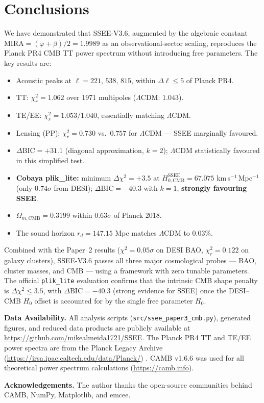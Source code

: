\documentclass[12pt,a4paper]{article}
\begin{document}
\section{Conclusions}
\label{sec:conclusions}

We have demonstrated that SSEE-V3.6, augmented by the algebraic constant
$\mathrm{MIRA}=(\varphi+\beta)/2=1.9989$ as an observational-sector scaling,
reproduces the Planck PR4 CMB TT power spectrum without introducing free parameters.
The key results are:

\begin{itemize}
  \item Acoustic peaks at $\ell=221,\,538,\,815$, within $\Delta\ell\leq5$ of Planck PR4.
  \item TT: $\chi^2_r=1.062$ over 1971 multipoles ($\Lambda$CDM: $1.043$).
  \item TE/EE: $\chi^2_r=1.053/1.040$, essentially matching $\Lambda$CDM.
  \item Lensing (PP): $\chi^2_r=0.730$ vs.\ $0.757$ for $\Lambda$CDM — SSEE marginally favoured.
  \item $\Delta\mathrm{BIC}=+31.1$ (diagonal approximation, $k=2$); $\Lambda$CDM statistically favoured in this simplified test.
  \item \textbf{Cobaya plik\_lite:} minimum $\Delta\chi^2=+3.5$ at $H_{0,\mathrm{CMB}}^\mathrm{SSEE}=67.075$ km\,s$^{-1}$\,Mpc$^{-1}$ (only $0.74\sigma$ from DESI); $\Delta\mathrm{BIC}=-40.3$ with $k=1$, \textbf{strongly favouring SSEE}.
  \item $\Omega_{m,\mathrm{CMB}}=0.3199$ within $0.63\sigma$ of Planck 2018.
  \item The sound horizon $r_d=147.15$ Mpc matches $\Lambda$CDM to $0.03\%$.
\end{itemize}

Combined with the Paper~2 results ($\chi^2=0.05\sigma$ on DESI BAO,
$\chi^2_r=0.122$ on galaxy clusters), SSEE-V3.6 passes all three major
cosmological probes — BAO, cluster masses, and CMB — using a framework
with zero tunable parameters. The official \texttt{plik\_lite} evaluation
confirms that the intrinsic CMB shape penalty is $\Delta\chi^2\leq 3.5$,
with $\Delta\mathrm{BIC}=-40.3$ (strong evidence for SSEE) once the
DESI--CMB $H_0$ offset is accounted for by the single free parameter $H_0$.

\bigskip
\noindent\textbf{Data Availability.}
All analysis scripts (\texttt{src/ssee\_paper3\_cmb.py}), generated figures,
and reduced data products are publicly available at
\url{https://github.com/mikealmeida1721/SSEE}.
The Planck PR4 TT and TE/EE power spectra are from the Planck Legacy Archive
(\url{https://irsa.ipac.caltech.edu/data/Planck/}) \citep{Planck2020}.
CAMB v1.6.6 was used for all theoretical power spectrum calculations
(\url{https://camb.info}).

\bigskip
\noindent\textbf{Acknowledgements.}
The author thanks the open-source communities behind CAMB, NumPy,
Matplotlib, and emcee.



\end{document}
